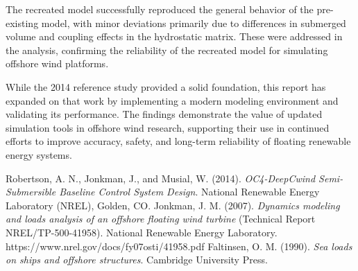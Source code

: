 \documentclass[a4paper, 11pt]{article}
\begin{document}
The recreated model successfully reproduced the general behavior of the pre-existing model, with minor deviations primarily due to differences in submerged volume and coupling effects in the hydrostatic matrix. These were addressed in the analysis, confirming the reliability of the recreated model for simulating offshore wind platforms.

While the 2014 reference study provided a solid foundation, this report has expanded on that work by implementing a modern modeling environment and validating its performance. The findings demonstrate the value of updated simulation tools in offshore wind research, supporting their use in continued efforts to improve accuracy, safety, and long-term reliability of floating renewable energy systems.


\newpage
\begin{thebibliography}{99}

 Robertson, A. N., Jonkman, J., and Musial, W. (2014). \textit{OC4-DeepCwind Semi-Submersible Baseline Control System Design}. National Renewable Energy Laboratory (NREL), Golden, CO.
 Jonkman, J. M. (2007). \textit{Dynamics modeling and loads analysis of an offshore floating wind turbine} (Technical Report NREL/TP-500-41958). National Renewable Energy Laboratory. https://www.nrel.gov/docs/fy07osti/41958.pdf
 Faltinsen, O. M. (1990). \textit{Sea loads on ships and offshore structures}. Cambridge University Press.


\end{thebibliography}
\end{document}
